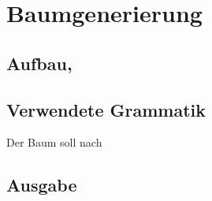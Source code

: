 \section{Baumgenerierung}
\subsection{Aufbau,}
\subsection{Verwendete Grammatik}
\label{tree_generation_used_grammar}
Der Baum soll nach
\subsection{Ausgabe}

